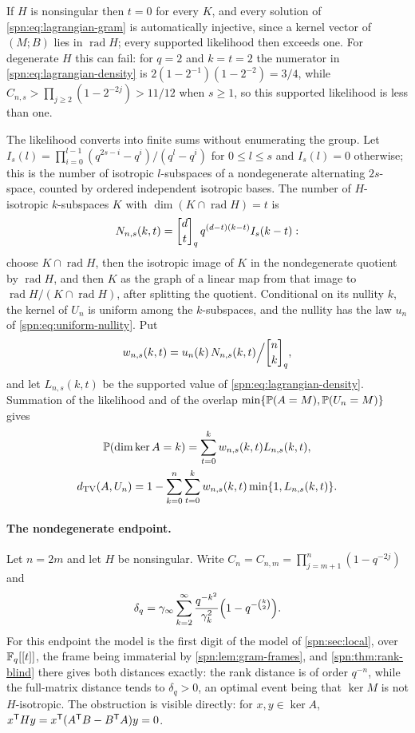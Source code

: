 If $H$ is nonsingular then $t=0$ for every $K$, and every solution of
\eqref{spn:eq:lagrangian-gram} is automatically injective, since a kernel vector of $(M;B)$
lies in $\operatorname{rad}H$; every supported likelihood then exceeds one. For degenerate $H$
this can fail: for $q=2$ and $k=t=2$ the numerator in \eqref{spn:eq:lagrangian-density} is
$2(1-2^{-1})(1-2^{-2})=3/4$, while $C_{n,s}>\prod_{j\ge2}(1-2^{-2j})>11/12$ when $s\ge1$, so
this supported likelihood is less than one.

The likelihood converts into finite sums without enumerating the group. Let
$I_s(l)=\prod_{i=0}^{l-1}(q^{2s-i}-q^i)/(q^l-q^i)$ for $0\le l\le s$ and $I_s(l)=0$
otherwise; this is the number of isotropic $l$-subspaces of a nondegenerate alternating
$2s$-space, counted by ordered independent isotropic bases. The number of $H$-isotropic
$k$-subspaces $K$ with $\dim(K\cap\operatorname{rad}H)=t$ is
\begin{equation}\label{spn:eq:kernel-types}
 N_{n,s}(k,t)=\spnqbin{d}{t}{q}\,q^{(d-t)(k-t)}I_s(k-t):
\end{equation}
choose $K\cap\operatorname{rad}H$, then the isotropic image of $K$ in the nondegenerate
quotient by $\operatorname{rad}H$, and then $K$ as the graph of a linear map from that image to
$\operatorname{rad}H/(K\cap\operatorname{rad}H)$, after splitting the quotient. Conditional on
its nullity $k$, the kernel of $U_n$ is uniform among the $k$-subspaces, and the nullity has
the law $u_n$ of \eqref{spn:eq:uniform-nullity}. Put
\[
 w_{n,s}(k,t)=u_n(k)\,N_{n,s}(k,t)\Big/\spnqbin nkq ,
\]
and let $L_{n,s}(k,t)$ be the supported value of \eqref{spn:eq:lagrangian-density}. Summation
of the likelihood and of the overlap $\min\{\mathbb{P}(A=M),\mathbb{P}(U_n=M)\}$ gives
\begin{gather}
 \mathbb{P}(\dim\ker A=k)=\sum_{t=0}^kw_{n,s}(k,t)L_{n,s}(k,t),\label{spn:eq:lagrangian-laws}\\
 d_{\mathrm{TV}}(A,U_n)=1-\sum_{k=0}^n\sum_{t=0}^kw_{n,s}(k,t)\min\{1,L_{n,s}(k,t)\} .\notag
\end{gather}

\paragraph{The nondegenerate endpoint.}
Let $n=2m$ and let $H$ be nonsingular. Write $C_n=C_{n,m}=\prod_{j=m+1}^n(1-q^{-2j})$ and
\begin{equation}\label{spn:eq:deltaq}
 \delta_q=\gamma_\infty\sum_{k=2}^\infty\frac{q^{-k^2}}{\gamma_k^2}\Bigl(1-q^{-\binom k2}\Bigr).
\end{equation}
For this endpoint the model is the first digit of the model of \cref{spn:sec:local}, over
$\mathbb{F}_q[[t]]$, the frame being immaterial by \cref{spn:lem:gram-frames}, and
\cref{spn:thm:rank-blind} there gives both distances exactly: the rank distance is of order
$q^{-n}$, while the full-matrix distance tends to $\delta_q>0$, an optimal event being that
$\ker M$ is not $H$-isotropic. The obstruction is visible directly: for $x,y\in\ker A$,
$x^{\mathsf{T}}Hy=x^{\mathsf{T}}(A^{\mathsf{T}}B-B^{\mathsf{T}}A)y=0$.


